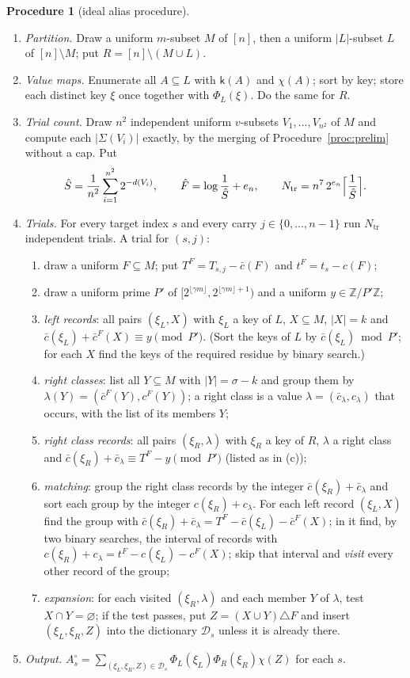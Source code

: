\documentclass[11pt]{article}
\theoremstyle{definition}
\newtheorem{procedure}[lemma]{Procedure}
\newcommand{\Z}{\mathbb Z}
\newcommand{\bc}{\bar c}
\newcommand{\abs}[1]{\lvert #1\rvert}
\newcommand{\floor}[1]{\lfloor #1\rfloor}
\newcommand{\cD}{\mathcal D}
\newcommand{\Ntr}{N_{\mathrm{tr}}}
\newcommand{\key}{\mathsf k}
\begin{document}
\begin{procedure}[ideal alias procedure]\label{proc:A}
\begin{enumerate}[label=\arabic*.]
\item \emph{Partition.} Draw a uniform $m$-subset $M$ of $[n]$, then a uniform $\abs L$-subset $L$ of $[n]\setminus M$;
put $R=[n]\setminus(M\cup L)$.
\item \emph{Value maps.} Enumerate all $A\subseteq L$ with $\key(A)$ and $\chi(A)$; sort by key; store each distinct
key $\xi$ once together with $\Phi_L(\xi)$. Do the same for $R$.
\item \emph{Trial count.} Draw $n^2$ independent uniform $v$-subsets $V_1,\dots,V_{n^2}$ of $M$ and compute each
$\abs{\Sigma(V_i)}$ exactly, by the merging of Procedure~\ref{proc:prelim} without a cap. Put
\[
 \hat S=\frac1{n^2}\sum_{i=1}^{n^2}2^{-d(V_i)},\qquad \hat F=\log\frac1{\hat S}+e_n,\qquad
 \Ntr=n^7\,2^{e_n}\Bigl\lceil\frac1{\hat S}\Bigr\rceil .
\]
\item \emph{Trials.} For every target index $s$ and every carry $j\in\{0,\dots,n-1\}$ run $\Ntr$ independent trials.
A trial for $(s,j)$:
\begin{enumerate}[label=(\alph*)]
\item draw a uniform $F\subseteq M$; put $T^F=T_{s,j}-\bc(F)$ and $t^F=t_s-c(F)$;
\item draw a uniform prime $P'$ of $[2^{\floor{\gamma m}},2^{\floor{\gamma m}+1})$ and a uniform $y\in\Z/P'\Z$;
\item \emph{left records}: all pairs $(\xi_L,X)$ with $\xi_L$ a key of $L$, $X\subseteq M$, $\abs X=k$ and
$\bc(\xi_L)+\bc^F(X)\equiv y\pmod{P'}$. (Sort the keys of $L$ by $\bc(\xi_L)\bmod P'$; for each $X$ find the keys of
the required residue by binary search.)
\item \emph{right classes}: list all $Y\subseteq M$ with $\abs Y=\sigma-k$ and group them by
$\lambda(Y)=(\bc^F(Y),c^F(Y))$; a right class is a value $\lambda=(\bc_\lambda,c_\lambda)$ that occurs, with the list
of its members $Y$;
\item \emph{right class records}: all pairs $(\xi_R,\lambda)$ with $\xi_R$ a key of $R$, $\lambda$ a right class and
$\bc(\xi_R)+\bc_\lambda\equiv T^F-y\pmod{P'}$ (listed as in (c));
\item \emph{matching}: group the right class records by the integer $\bc(\xi_R)+\bc_\lambda$ and sort each group by
the integer $c(\xi_R)+c_\lambda$. For each left record $(\xi_L,X)$ find the group with
$\bc(\xi_R)+\bc_\lambda=T^F-\bc(\xi_L)-\bc^F(X)$; in it find, by two binary searches, the interval of records with
$c(\xi_R)+c_\lambda=t^F-c(\xi_L)-c^F(X)$; skip that interval and \emph{visit} every other record of the group;
\item \emph{expansion}: for each visited $(\xi_R,\lambda)$ and each member $Y$ of $\lambda$, test $X\cap Y=\varnothing$;
if the test passes, put $Z=(X\cup Y)\triangle F$ and insert $(\xi_L,\xi_R,Z)$ into the dictionary $\cD_s$ unless it
is already there.
\end{enumerate}
\item \emph{Output.} $A^\circ_s=\sum_{(\xi_L,\xi_R,Z)\in\cD_s}\Phi_L(\xi_L)\Phi_R(\xi_R)\chi(Z)$ for each $s$.
\end{enumerate}
\end{procedure}
\end{document}
